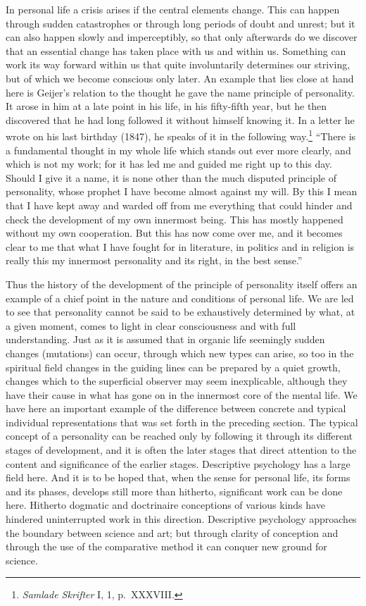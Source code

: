 \documentclass[12pt]{article}
\newcommand{\opage}[1]{\marginnote{\footnotesize\textit{[#1]}}}
\begin{document}
In personal life a crisis arises if the central elements change. This can
happen through sudden catastrophes or through long periods of doubt and unrest;
but it can also happen slowly and imperceptibly, so that only afterwards do we
discover that an essential change has taken place with us and within us.
Something can work its way forward within us that quite involuntarily determines
our striving, but of which we become conscious only later. An example that lies
close at hand here is Geijer's relation to the thought he gave the name
principle of personality. It arose in him at a late point in his life, in his
fifty-fifth year, but he then discovered that he had long followed it without
himself knowing it. In a letter he wrote on his last birthday (1847), he speaks
of it in the following way.\footnote{\textit{Samlade Skrifter} I, 1, p.~XXXVIII.}
``There is a fundamental thought in my
\opage{37}%
whole life which stands out ever more clearly, and which is not my work; for it
has led me and guided me right up to this day. Should I give it a name, it is
none other than the much disputed principle of personality, whose prophet I have
become almost against my will. By this I mean that I have kept away and warded
off from me everything that could hinder and check the development of my own
innermost being. This has mostly happened without my own cooperation. But this
has now come over me, and it becomes clear to me that what I have fought for in
literature, in politics and in religion is really this my innermost personality
and its right, in the best sense.''

Thus the history of the development of the principle of personality itself
offers an example of a chief point in the nature and conditions of personal
life. We are led to see that personality cannot be said to be exhaustively
determined by what, at a given moment, comes to light in clear consciousness
and with full understanding. Just as it is assumed that in organic life
seemingly sudden changes (mutations) can occur, through which new types can
\opage{38}%
arise, so too in the spiritual field changes in the guiding lines can be
prepared by a quiet growth, changes which to the superficial observer may seem
inexplicable, although they have their cause in what has gone on in the
innermost core of the mental life. We have here an important example of the
difference between concrete and typical individual representations that was set
forth in the preceding section. The typical concept of a personality can be
reached only by following it through its different stages of development, and
it is often the later stages that direct attention to the content and
significance of the earlier stages. Descriptive psychology has a large field
here. And it is to be hoped that, when the sense for personal life, its forms
and its phases, develops still more than hitherto, significant work can be done
here. Hitherto dogmatic and doctrinaire conceptions of various kinds have
hindered uninterrupted work in this direction. Descriptive psychology approaches
the boundary between science and art; but through clarity of conception and
through the use of the comparative method it can conquer new ground for
science.
\end{document}
